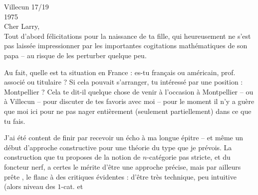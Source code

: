 \hfill Villecun 17/19 \\
\hfill 1975\\
Cher Larry,\\

Tout d'abord félicitations pour la naissance de ta fille, qui heureusement ne s'est pas laissée impressionner par les importantes cogitations mathématiques de son papa -- au risque de les perturber quelque peu.

Au fait, quelle est ta situation en France : es-tu français ou américain, prof. associé ou titulaire ? Si cela pouvait s'arranger,  tu intéressé par une position : Montpellier ? Cela te dit-il quelque chose de venir à l'occasion à Montpellier -- ou à Villecun -- pour discuter de tes favoris avec moi -- pour le moment il n'y a guère que moi ici pour ne pas nager entièrement (seulement partiellement) dans ce que tu fais.

J'ai été content de finir par recevoir un écho à ma longue épitre -- et même un début d'approche constructive pour  une théorie du type que je prévois. La construction que tu proposes de la notion de $n$-catégorie pas stricte, et du foncteur nerf, a certes le mérite  d'être une  approche précise, mais par ailleurs prête  , le flanc à des critiques évidentes : d'être très technique, peu intuitive (alors  niveau des $1$-cat. et
